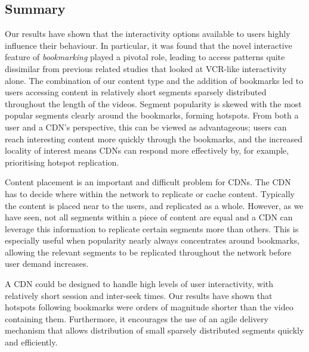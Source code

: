 \documentclass[a4paper,11pt]{article}
\begin{document}
\subsection{Summary}

%

Our results have shown that the interactivity options available to users highly influence their behaviour. In particular, it was found that the novel interactive feature of \emph{bookmarking} played a pivotal role, leading to access patterns quite dissimilar from previous related studies that looked at VCR-like interactivity alone.
The combination of our content type and the addition of bookmarks led to users accessing content in relatively short segments sparsely distributed throughout the length of the videos. Segment popularity is skewed with the most popular segments clearly around the bookmarks, forming hotspots. From both a user and a CDN's perspective, this can be viewed as advantageous; users can reach interesting content more quickly through the bookmarks, and the increased locality of interest means CDNs can respond more effectively by, for example, prioritising hotspot replication.

Content placement is an important and difficult problem for CDNs. The CDN has to decide where within the network to replicate or cache content. Typically the content is placed near to the users, and replicated as a whole. However, as we have seen, not all segments within a piece of content are equal and a CDN can leverage this information to replicate certain segments more than others. This is especially useful when popularity nearly always concentrates around bookmarks, allowing the relevant segments to be replicated throughout the network before user demand increases.

A CDN could be designed to handle high levels of user interactivity, with relatively short session and inter-seek times. Our results have shown that hotspots following bookmarks were orders of magnitude shorter than the video containing them. Furthermore, it encourages the use of an agile delivery mechanism that allows distribution of small sparsely distributed segments quickly and efficiently.
\end{document}
